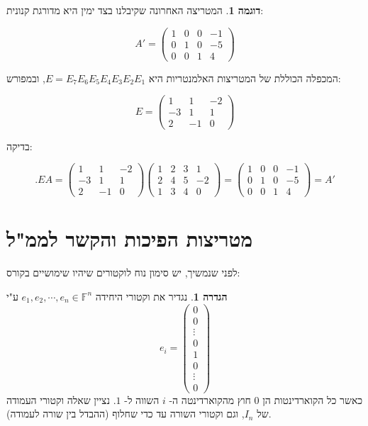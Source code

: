\documentclass[12pt]{report}
\theoremstyle{plain}
\theoremstyle{definition}
\newtheorem{definition}[theorem]{הגדרה}
\newtheorem{example}{דוגמה}[chapter]
\newcommand{\F}{\mathbb{F}}
\newcommand{\0}{\mathbf{0}}
\begin{document}
\begin{example}
המטריצה האחרונה שקיבלנו בצד ימין היא מדורגת קנונית:

$$
A'=
\begin{pmatrix}
1 & 0 & 0 & -1 \\
0 & 1 & 0 & -5 \\
0 & 0 & 1 & 4
\end{pmatrix}
$$

המכפלה הכוללת של המטריצות האלמנטריות היא
$E = E_7 E_6 E_5 E_4 E_3 E_2 E_1$,
ובמפורש:

$$
E =
\begin{pmatrix}
1 & 1 & -2 \\
-3 & 1 & 1 \\
2 & -1 & 0
\end{pmatrix}
$$

בדיקה:

$$
.EA =
\begin{pmatrix}
1 & 1 & -2 \\
-3 & 1 & 1 \\
2 & -1 & 0
\end{pmatrix}\begin{pmatrix}
1 & 2 & 3 & 1 \\
2 & 4 & 5 & -2 \\
1 & 3 & 4 & 0
\end{pmatrix}=\begin{pmatrix}
1 & 0 & 0 & -1 \\
0 & 1 & 0 & -5 \\
0 & 0 & 1 & 4
\end{pmatrix}
=A'
$$
\end{example}

\section{מטריצות הפיכות והקשר לממ"ל}


לפני שנמשיך, יש סימון נוח לוקטורים שיהיו שימושיים בקורס:

\begin{definition}
נגדיר את וקטורי היחידה
$e_1,e_2,\cdots,e_n\in\F^n$
ע"י
$$
e_i=\begin{pmatrix}
0 \\
0 \\
\vdots \\
0 \\
1 \\
0\\
\vdots \\
0
\end{pmatrix}
$$
כאשר כל הקוארדינטות הן
$0$
חוץ מהקוארדינטה ה-
$i$
השווה ל-
$1$.
נציין שאלה וקטורי העמודה של 
$I_n$,
וגם וקטורי השורה עד כדי שחלוף (ההבדל בין שורה לעמודה).
\end{definition}
\end{document}

